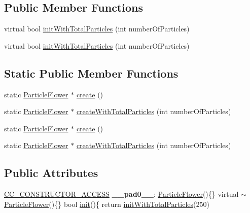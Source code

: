 \subsection*{Public Member Functions}
\begin{DoxyCompactItemize}
\item 
virtual bool \hyperlink{classParticleFlower_a66c7457e917237e5a8590fc84683ff1e}{init\+With\+Total\+Particles} (int number\+Of\+Particles)
\item 
virtual bool \hyperlink{classParticleFlower_adbcd387e538bdf406a27cd94c81630f9}{init\+With\+Total\+Particles} (int number\+Of\+Particles)
\end{DoxyCompactItemize}
\subsection*{Static Public Member Functions}
\begin{DoxyCompactItemize}
\item 
static \hyperlink{classParticleFlower}{Particle\+Flower} $\ast$ \hyperlink{classParticleFlower_af5c0e9c221a073113f428cf4d500fde1}{create} ()
\item 
static \hyperlink{classParticleFlower}{Particle\+Flower} $\ast$ \hyperlink{classParticleFlower_a65c4463d6bdfcba4b95fcc1200b810e0}{create\+With\+Total\+Particles} (int number\+Of\+Particles)
\item 
static \hyperlink{classParticleFlower}{Particle\+Flower} $\ast$ \hyperlink{classParticleFlower_a4f91344e95021e6693ec17e1bb5f174f}{create} ()
\item 
static \hyperlink{classParticleFlower}{Particle\+Flower} $\ast$ \hyperlink{classParticleFlower_a7fc629db7e755ab4cff3af5bde80193c}{create\+With\+Total\+Particles} (int number\+Of\+Particles)
\end{DoxyCompactItemize}
\subsection*{Public Attributes}
\begin{DoxyCompactItemize}
\item 
\mbox{\label{classParticleFlower_a79cf6ef74df3acaa527a3c87bd1aaedc}} 
\hyperlink{_2cocos2d_2cocos_2base_2ccConfig_8h_a25ef1314f97c35a2ed3d029b0ead6da0}{C\+C\+\_\+\+C\+O\+N\+S\+T\+R\+U\+C\+T\+O\+R\+\_\+\+A\+C\+C\+E\+SS} {\bfseries \+\_\+\+\_\+pad0\+\_\+\+\_\+}\+: \hyperlink{classParticleFlower}{Particle\+Flower}()\{\} virtual $\sim$\hyperlink{classParticleFlower}{Particle\+Flower}()\{\} bool \hyperlink{classParticleSystem_a65c05b30432f6e8aeb45ba018f3a8d3f}{init}()\{ return \hyperlink{classParticleFlower_a66c7457e917237e5a8590fc84683ff1e}{init\+With\+Total\+Particles}(250)
\end{DoxyCompactItemize}
